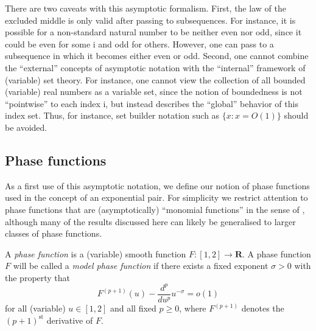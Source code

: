 \documentclass[a4paper, 10pt]{amsart}
\newcommand{\R}{\mathbf{R}}
\newcommand{\ii}{{\mathrm{i}}}
\begin{document}
\begin{remark} There are two caveats with this asymptotic formalism.  First, the law of the excluded middle is only valid after passing to subsequences.  For instance, it is possible for a non-standard natural number to be neither even nor odd, since it could be even for some $\ii$ and odd for others.  However, one can pass to a subsequence in which it becomes either even or odd.  Second, one cannot combine the ``external'' concepts of asymptotic notation with the ``internal'' framework of (variable) set theory.  For instance, one cannot view the collection of all bounded (variable) real numbers as a variable set, since the notion of boundedness is not ``pointwise'' to each index $\ii$, but instead describes the ``global'' behavior of this index set.  Thus, for instance, set builder notation such as $\{ x: x = O(1) \}$ should be avoided.
\end{remark}

\subsection{Phase functions}

As a first use of this asymptotic notation, we define our notion of phase functions used in the concept of an exponential pair.  For simplicity we restrict attention to phase functions that are (asymptotically) ``monomial functions'' in the sense of \cite[Chapter 3]{huxley_area_1996}, although many of the results discussed here can likely be generalised to larger classes of phase functions.

\begin{definition}\label{phase-def}
    A \emph{phase function} is a (variable) smooth function $F \colon [1,2] \to \R$.  A phase function $F$ will be called a \emph{model phase function} if there exists a fixed exponent $\sigma > 0$ with the property that
    \begin{equation}\label{fpu}
    F^{(p+1)}(u) - \frac{d^p}{du^p} u^{-\sigma} = o(1)
    \end{equation}
    for all (variable) $u \in [1,2]$ and all fixed $p \geq 0$, where $F^{(p+1)}$ denotes the $(p+1)^{\mathrm{st}}$ derivative of $F$.
    \end{definition}
\end{document}
